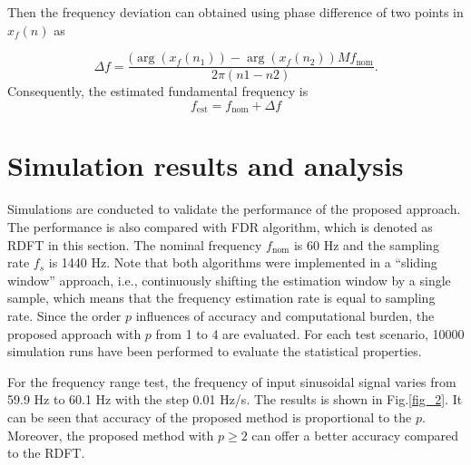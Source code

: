 \documentclass[journal,twoside]{IEEEtran}
\begin{document}

Then the frequency deviation can obtained using phase difference of two 
 points in $x_f(n)$ as 

\begin{equation}
\Delta f=\dfrac{(\arg(x_f(n_1))-\arg(x_f(n_2))Mf_\mathrm{nom}}{2\pi(n1-n2)}.\label{eqn_12}
\end{equation}
Consequently, the estimated fundamental frequency is
\begin{equation}
f_\mathrm{est}=f_\mathrm{nom}+\Delta f\label{eqn_13}
\end{equation}









\section{Simulation results and analysis}
Simulations are conducted to validate the performance of the proposed approach. The performance is also compared with FDR algorithm\cite{chenjian,7265090}, which is denoted as RDFT in this section.
The nominal frequency $f_\mathrm{nom}$ is 60 Hz and the sampling rate $f_s$ is 1440 Hz. Note that both algorithms were implemented in a “sliding window” approach, i.e., continuously shifting the estimation window by a single sample, which means that the frequency estimation rate is equal to sampling rate. Since the order $p$ influences of accuracy and computational burden, the proposed approach with $p$ from 1 to 4 are evaluated. For each test scenario, 10000 simulation runs have been performed to evaluate the statistical properties.  

For the frequency range test, the  frequency of  input sinusoidal signal  varies from 59.9 Hz to 60.1 Hz with the step 0.01 Hz/s. The results is shown in Fig.\ref{fig_2}. It can be seen that accuracy of the proposed method is proportional to the $p$. Moreover, the proposed method with  $p\geq2$ can offer a better accuracy compared to the RDFT.
\end{document}

